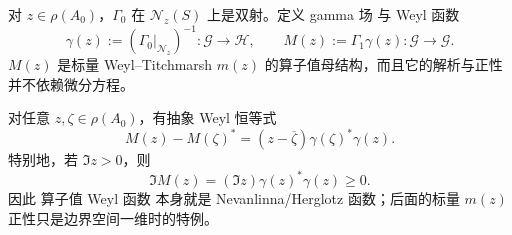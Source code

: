 \begin{definition}
对 $z\in\rho(A_0)$，$\Gamma_0$ 在 $\mathcal N_z(S)$ 上是双射。定义 gamma 场 与 Weyl 函数
\begin{equation*}\gamma(z):=(\Gamma_0|_{\mathcal N_z})^{-1}:\mathcal G\to\mathcal H,
 \qquad
 M(z):=\Gamma_1\gamma(z):\mathcal G\to\mathcal G.
\end{equation*}
$M(z)$ 是标量 Weyl--Titchmarsh $m(z)$ 的算子值母结构，而且它的解析与正性并不依赖微分方程。
\end{definition}

\begin{proposition}
对任意 $z,\zeta\in\rho(A_0)$，有抽象 Weyl 恒等式
\begin{equation}\label{eq:math-sl-abstract-weyl-identity}
 M(z)-M(\zeta)^*
 =(z-\overline\zeta)\gamma(\zeta)^*\gamma(z).
\end{equation}
特别地，若 $\Im z>0$，则
\begin{equation}\label{eq:math-sl-operator-weyl-herglotz}
 \Im M(z)
 =(\Im z)\gamma(z)^*\gamma(z)\ge0.
\end{equation}
因此 算子值 Weyl 函数 本身就是 Nevanlinna/Herglotz 函数；后面的标量 $m(z)$ 正性只是边界空间一维时的特例。
\end{proposition}


